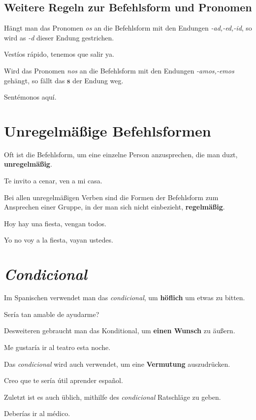 \subsection*{Weitere Regeln zur Befehlsform und Pronomen}
Hängt man das Pronomen \textit{os} an die Befehlsform mit den
Endungen \textit{-ad,-ed,-id}, so wird as \textit{-d} 
dieser Endung gestrichen.
\begin{ejemplos}
    \item Vest\'ios r\'apido, tenemos que salir ya.
\end{ejemplos}
Wird das Pronomen \textit{nos} an die Befehlsform mit den
Endungen \textit{-amos,-emos} gehängt, so fällt das \textbf{s}
der Endung weg.
\begin{ejemplos}
    \item Sent\'emonos aqu\'i.
\end{ejemplos}
\section{Unregelmäßige Befehlsformen}
Oft ist die Befehlsform, um eine einzelne Person anzusprechen,
die man duzt, \textbf{unregelmäßig}.
\begin{ejemplos}
    \item Te invito a cenar, ven a mi casa.
\end{ejemplos}
Bei allen unregelmäßigen Verben sind die Formen der Befehlsform
zum Ansprechen einer Gruppe, in der man sich nicht einbezieht,
\textbf{regelmäßig}.
\begin{ejemplos}
    \item Hoy hay una fiesta, vengan todos.
    \item Yo no voy a la fiesta, vayan ustedes.
\end{ejemplos}
\section{\textit{Condicional}}
Im Spanischen verwendet man das \textit{condicional}, um 
\textbf{höflich} um etwas zu bitten.
\begin{ejemplos}
    \item Ser\'ia tan amable de ayudarme?
\end{ejemplos}
Desweiteren gebraucht man das Konditional, um 
\textbf{einen Wunsch} zu äußern.
\begin{ejemplos}
    \item Me gustar\'ia ir al teatro esta noche.
\end{ejemplos}
Das \textit{condicional} wird auch verwendet, um 
eine \textbf{Vermutung} auszudrücken.
\begin{ejemplos}
    \item Creo que te ser\'ia \'util aprender espa\~nol.
\end{ejemplos}
Zuletzt ist es auch üblich, mithilfe des \textit{condicional}
Ratschläge zu geben.
\begin{ejemplos}
    \item Deber\'ias ir al m\'edico.
\end{ejemplos}
